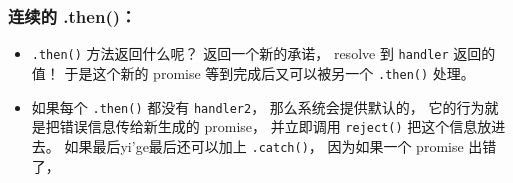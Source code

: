 \subsubsection{连续的 .then()：}
\begin{itemize}
\item \verb`.then()` 方法返回什么呢？ 返回一个新的承诺， resolve 到 \verb`handler` 返回的值！ 于是这个新的 promise 等到完成后又可以被另一个 \verb`.then()` 处理。
\item 如果每个 \verb`.then()` 都没有 \verb`handler2`， 那么系统会提供默认的， 它的行为就是把错误信息传给新生成的 promise， 并立即调用 \verb`reject()` 把这个信息放进去。 如果最后yi'ge最后还可以加上 \verb`.catch()`， 因为如果一个 promise 出错了，
\end{itemize}
